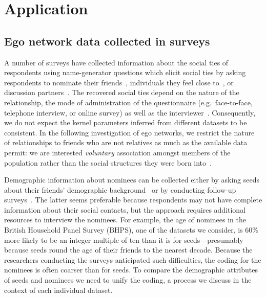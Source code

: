 \documentclass{scrartcl}
\begin{document}
\section{Application}

\subsection{Ego network data collected in surveys}

A number of surveys have collected information about the social ties of respondents using name-generator questions which elicit social ties by asking respondents to nominate their friends~\cite{Kalmijn2007}, individuals they feel close to~\cite{Hipp2009}, or discussion partners~\cite{Marsden1987,McPherson2006}. The recovered social ties depend on the nature of the relationship, the mode of administration of the questionnaire (e.g.\ face-to-face, telephone interview, or online survey) as well as the interviewer~\cite{Marin2004,Eagle2015}. Consequently, we do not expect the kernel parameters inferred from different datasets to be consistent. In the following investigation of ego networks, we restrict the nature of relationships to friends who are not relatives as much as the available data permit: we are interested \emph{voluntary} association amongst members of the population rather than the social structures they were born into~\cite{Kalmijn2007}.

Demographic information about nominees can be collected either by asking seeds about their friends' demographic background~\cite{Marsden1987,McPherson2006} or by conducting follow-up surveys~\cite{Johnson1989}. The latter seems preferable because respondents may not have complete information about their social contacts, but the approach requires additional resources to interview the nominees. %
For example, the age of nominees in the British Household Panel Survey (BHPS), one of the datasets we consider, is 60\% more likely to be an integer multiple of ten than it is for seeds---presumably because seeds round the age of their friends to the nearest decade. Because the researchers conducting the surveys anticipated such difficulties, the coding for the nominees is often coarser than for seeds. To compare the demographic attributes of seeds and nominees we need to unify the coding, a process we discuss in the context of each individual dataset.
\end{document}

